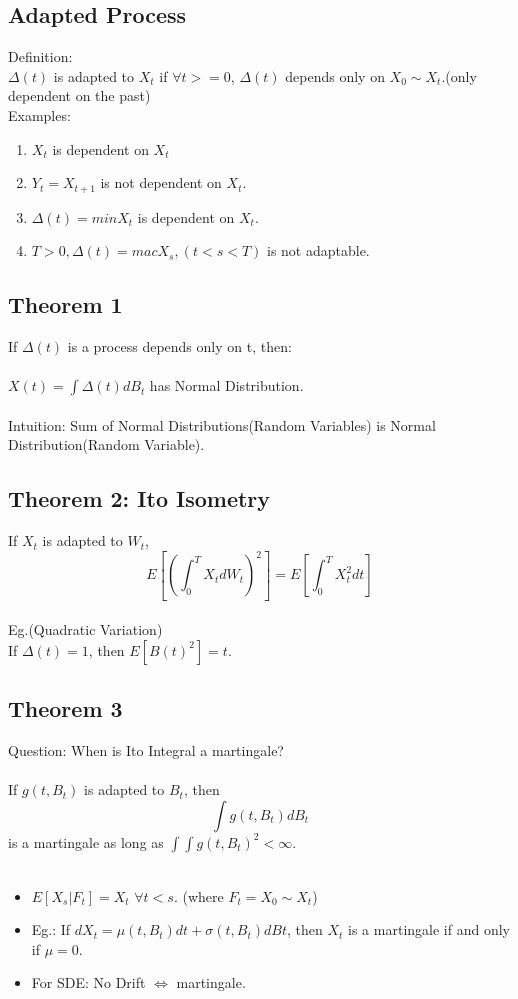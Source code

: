 \documentclass[12pt]{article}
\begin{document}
\subsection{Adapted Process}
Definition:\\
$\Delta(t)$ is adapted to $X_t$ if $\forall t>=0$, $\Delta(t)$ depends only on $X_0\sim X_t$.(only dependent on the past)\\
Examples:\\
\begin{enumerate}
    \item $X_t$ is dependent on $X_t$
    \item $Y_t=X_{t+1}$ is not dependent on $X_t$.
    \item $\Delta(t)=min{X_t}$ is dependent on $X_t$.
    \item $T>0, \Delta(t)=mac{X_s}, (t<s<T)$ is not adaptable.
\end{enumerate}

\subsection{Theorem 1}
If $\Delta(t)$ is a process depends only on t, then:\\
\\
$X(t)=\int \Delta(t)dB_t$ has Normal Distribution.\\
\\Intuition: Sum of Normal Distributions(Random Variables) is Normal Distribution(Random Variable).\\

\subsection{Theorem 2: Ito Isometry}
If $X_t$ is adapted to $W_t$,\\
$$E[(\int_0^T X_t dW_t)^2]=E[\int_0^T X_t^2dt]$$
\\
Eg.(Quadratic Variation)\\
If $\Delta(t)=1$, then $E[B(t)^2]=t$.

\subsection{Theorem 3}
Question: When is Ito Integral a martingale?\\
\\
If $g(t,B_t)$ is adapted to $B_t$, then
$$\int g(t,B_t)dB_t$$
is a martingale as long as $\int\int g(t,B_t)^2<\infty$.\\
\\
\begin{itemize}
    \item $E[X_s|F_t]=X_t$ $\forall t<s$. (where $F_t=X_0 \sim X_t$)
    \item Eg.: If $dX_t=\mu(t,B_t)dt + \sigma(t,B_t)dBt$, then $X_t$ is a martingale if and only if $\mu=0$.
    \item For SDE: No Drift $\Leftrightarrow$ martingale.
\end{itemize}
\end{document}
